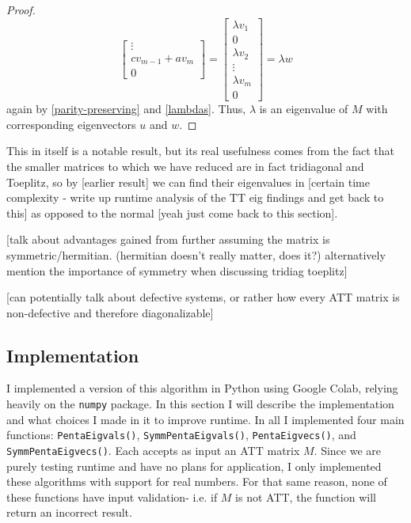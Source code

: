 \documentclass[10pt,twocolumn]{article}
\begin{document}
\begin{proof}
$$\begin{bmatrix}
        \vdots \\
        cv_{m-1} + av_m \\
        0
    \end{bmatrix} 
    =\begin{bmatrix}
        \lambda v_1 \\
        0\\
        \lambda v_2 \\
        \vdots \\
        \lambda v_m \\
        0
    \end{bmatrix}
    =\lambda w
    $$
    again by \ref{parity-preserving} and \ref{lambdas}.
    Thus, $\lambda$ is an eigenvalue of $M$ with corresponding eigenvectors $u$ and $w$.
\end{proof}

This in itself is a notable result, but its real usefulness comes from the fact that the smaller matrices to which we have reduced are in fact tridiagonal and Toeplitz, so by [earlier result] we can find their eigenvalues in [certain time complexity - write up runtime analysis of the TT eig findings and get back to this] as opposed to the normal [yeah just come back to this section].

[talk about advantages gained from further assuming the matrix is symmetric/hermitian. (hermitian doesn't really matter, does it?) alternatively mention the importance of symmetry when discussing tridiag toeplitz]

[can potentially talk about defective systems, or rather how every ATT matrix is non-defective and therefore diagonalizable]
 
\subsection{Implementation}

I implemented a version of this algorithm in Python using Google Colab, relying heavily on the \verb|numpy| package. In this section I will describe the implementation and what choices I made in it to improve runtime. In all I implemented four main functions: \verb|PentaEigvals()|, \verb|SymmPentaEigvals()|, \verb|PentaEigvecs()|, and \verb|SymmPentaEigvecs()|. Each accepts as input an ATT matrix $M$. Since we are purely testing runtime and have no plans for application, I only implemented these algorithms with support for real numbers. For that same reason, none of these functions have input validation- i.e. if $M$ is not ATT, the function will return an incorrect result.
\end{document}
